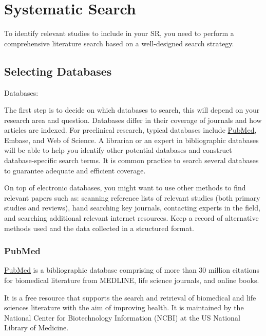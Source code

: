 \documentclass[
]{book}
\begin{document}
\hypertarget{systematic-search}{%
\chapter{Systematic Search}\label{systematic-search}}

To identify relevant studies to include in your SR, you need to perform a comprehensive literature search based on a well-designed search strategy.

\hypertarget{selecting-databases}{%
\section{Selecting Databases}\label{selecting-databases}}

Databases:

The first step is to decide on which databases to search, this will depend on your research area and question. Databases differ in their coverage of journals and how articles are indexed. For preclinical research, typical databases include \href{https://pubmed.ncbi.nlm.nih.gov/}{PubMed}, Embase, and Web of Science. A librarian or an expert in bibliographic databases will be able to help you identify other potential databases and construct database-specific search terms. It is common practice to search several databases to guarantee adequate and efficient coverage.

On top of electronic databases, you might want to use other methods to find relevant papers such as: scanning reference lists of relevant studies (both primary studies and reviews), hand searching key journals, contacting experts in the field, and searching additional relevant internet resources. Keep a record of alternative methods used and the data collected in a structured format.

\hypertarget{pubmed}{%
\subsection{PubMed}\label{pubmed}}

\href{https://pubmed.ncbi.nlm.nih.gov/}{PubMed} is a bibliographic database comprising of more than 30 million citations for biomedical literature from MEDLINE, life science journals, and online books.

It is a free resource that supports the search and retrieval of biomedical and life sciences literature with the aim of improving health. It is maintained by the National Center for Biotechnology Information (NCBI) at the US National Library of Medicine.
\end{document}
